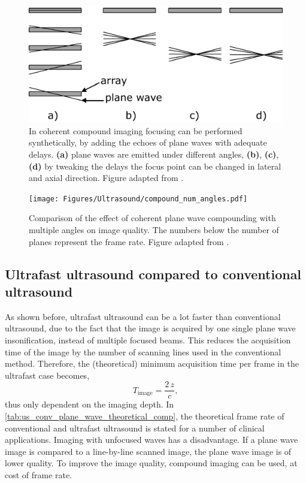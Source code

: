 \begin{figure}
	\centering
	\includegraphics[width=.6\linewidth]{Figures/Ultrasound/coherent_compounding.pdf}
	\caption{In coherent compound imaging focusing can be performed synthetically, by adding the echoes of plane waves with adequate delays. \textbf{(a)} plane waves are emitted under different angles, \textbf{(b)}, \textbf{(c)}, \textbf{(d)} by tweaking the delays the focus point can be changed in lateral and axial direction. Figure adapted from \citet{montaldo_coherent_2009}.}
	\label{fig:us_coherent_compounding}
\end{figure}


\begin{figure}
    \centering
    \texttt{[image: Figures/Ultrasound/compound\_num\_angles.pdf]}
    \caption{Comparison of the effect of coherent plane wave compounding with multiple angles on image quality. The numbers below the number of planes represent the frame rate. Figure adapted from \citet{montaldo_coherent_2009}.}
    \label{fig:us_compound_num_angles}
\end{figure}





\subsection{Ultrafast ultrasound compared to conventional ultrasound}
As shown before, ultrafast ultrasound can be a lot faster than conventional ultrasound, due to the fact that the image is acquired by one single plane wave insonification, instead of multiple focused beams. This reduces the acquisition time of the image by the number of scanning lines used in the conventional method. Therefore, the (theoretical) minimum acquisition time per frame in the ultrafast case becomes, 
\begin{equation}
	T_\text{image} = \frac{2 \, z}{c},
\end{equation}
thus only dependent on the imaging depth. In \autoref{tab:us_conv_plane_wave_theoretical_comp}, the theoretical frame rate of conventional and ultrafast ultrasound is stated for a number of clinical applications. Imaging with unfocused waves has a disadvantage. If a plane wave image is compared to a line-by-line scanned image, the plane wave image is of lower quality. To improve the image quality, compound imaging can be used, at cost of frame rate. 


